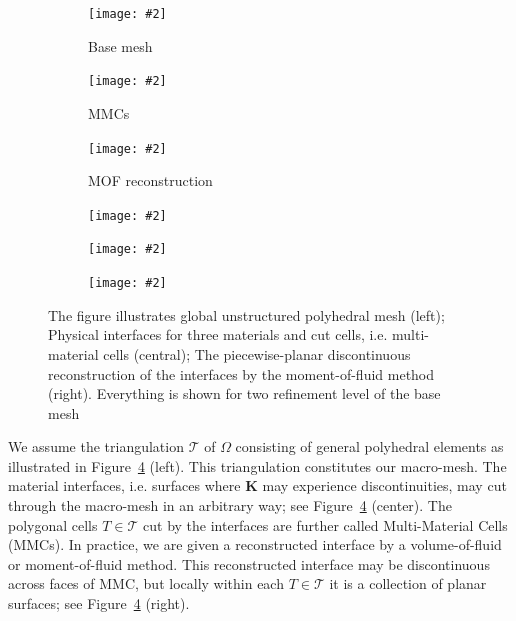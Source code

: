 \documentclass[12pt]{article}
\newcommand{\includegraphicsw}[2][1.]{\texttt{[image: \#2]}}
\newcommand{\vect}[1]{\boldsymbol{\mathbf{#1}}}
\newcommand{\bcell}{T}
\newcommand{\bmesh}{{\vect{\mathcal T}}}
\begin{document}
	\begin{figure}[h]
		\centering
		\begin{subfigure}{.33\linewidth}
			\centering
			\includegraphicsw{ring_base_voronoi.png}
			\caption{Base mesh}
			\label{fig:problem_geometry:base_mesh}
		\end{subfigure}%
		\hfill
		\begin{subfigure}{.33\linewidth}
			\centering
			\includegraphicsw{ring_mmcs_voronoi.png}
			\caption{MMCs}
			\label{fig:problem_geometry:mmcs}
		\end{subfigure}%
		\hfill
		\begin{subfigure}{.33\linewidth}
			\centering
			\includegraphicsw{ring_mini_voronoi.png}
			\caption{MOF reconstruction}
			\label{fig:problem_geometry:mof}
		\end{subfigure}
		\begin{subfigure}{.33\linewidth}
			\centering
			\includegraphicsw{ring_base_voronoi_refined.png}
		\end{subfigure}%
		\hfill
		\begin{subfigure}{.33\linewidth}
			\centering
			\includegraphicsw{ring_mmcs_voronoi_refined.png}
		\end{subfigure}%
		\hfill
		\begin{subfigure}{.33\linewidth}
			\centering
			\includegraphicsw{ring_mini_voronoi_refined.png}
		\end{subfigure}
		\caption{The figure illustrates global unstructured polyhedral mesh (left); Physical interfaces for three materials and cut cells, i.e. multi-material cells (central); The piecewise-planar discontinuous reconstruction of the interfaces by the moment-of-fluid method (right). Everything is shown for two refinement level of the base mesh \label{fig:problem_geometry}}
	\end{figure}
	
	We assume the triangulation  $\bmesh$ of $\Omega$ consisting of general polyhedral elements as illustrated in Figure~\ref{fig:problem_geometry} (left). This triangulation constitutes our macro-mesh. The material interfaces, i.e. surfaces where $\vect K$ may experience discontinuities, may cut through the macro-mesh in an arbitrary way; see Figure~\ref{fig:problem_geometry} (center). The polygonal cells ${\bcell \in \bmesh}$ cut by the interfaces are further called Multi-Material Cells (MMCs). In practice,  we are given a reconstructed interface by a volume-of-fluid or moment-of-fluid method. This reconstructed interface may be discontinuous across faces of MMC, but locally within each ${\bcell \in \bmesh}$ it is a collection of planar surfaces; see Figure~\ref{fig:problem_geometry} (right).
	
\end{document}
